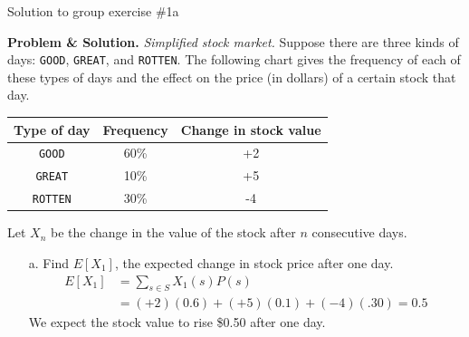 \documentclass[10pt]{beamer}
\begin{document}
\begin{frame}{Solution to group exercise \#1a}
\footnotesize 

\textbf{Problem \& Solution.} \textit{Simplified stock market.} Suppose there are three kinds of days: \texttt{GOOD}, \texttt{GREAT}, and \texttt{ROTTEN}. The following chart gives the frequency of each of these types of days and the effect on the price (in dollars) of a certain stock that day.
	\vspace{-.2cm}
	\begin{table}[H]
	\begin{tabular}{|c|c|c|}
	\toprule 
	\colorbox{blue!30}{Type of day} & 	\colorbox{blue!30}{Frequency} & \colorbox{blue!30}{Change in stock value} \\
	\midrule 
	\texttt{GOOD} & 60\% & +2 \\
	\texttt{GREAT} & 10\% & +5 \\
	\texttt{ROTTEN} & 30\% & -4 \\
	\bottomrule 
	\end{tabular}
	\end{table}
	\vspace{-.2cm}
	Let $X_n$ be the change in the value of the stock after $n$ consecutive days.
		\vspace{-.2cm}
	 \begin{itemize} \footnotesize 
	\item[a.] Find $E[X_1]$, the expected change in stock price after one day. 
	\begin{align*}
	 E[X_1] &= \sum_{s \in S} X_1(s) P(s)  \\
	 &= (+2)(0.6) + 	(+5)(0.1) + (-4)(.30) = 0.5
	\end{align*}
	We expect the stock value to rise \$0.50 after one day.
	\end{itemize}
\end{frame}
\end{document}
